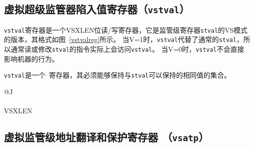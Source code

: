 \subsection{虚拟超级监管器陷入值寄存器（{\tt vstval}）}

{\tt vstval}寄存器是一个VSXLEN位读/写寄存器，它是监管级寄存器{\tt stval}的VS模式的版本，其格式如图~\ref{vstvalreg}所示。
当V=1时，{\tt vstval}代替了通常的{\tt stval}，所以通常读或修改{\tt stval}的指令实际上会访问{\tt vstval}。
当V=0时，{\tt vstval}不会直接影响机器的行为。

{\tt vstval}是一个\warl\ 寄存器，其必须能够保持与{\tt stval}可以保持的相同值的集合。

\begin{figure*}[h!]
{\footnotesize
\begin{center}
\begin{tabular}{@{}J}
 \\
\hline
{} \\
\hline
VSXLEN \\
\end{tabular}
\end{center}
}
\vspace{-0.1in}
\caption{虚拟超级监管器陷入值寄存器（{\tt vstval}）。
  }
\label{vstvalreg}
\end{figure*}

\subsection{虚拟监管级地址翻译和保护寄存器 （{\tt vsatp}）}


